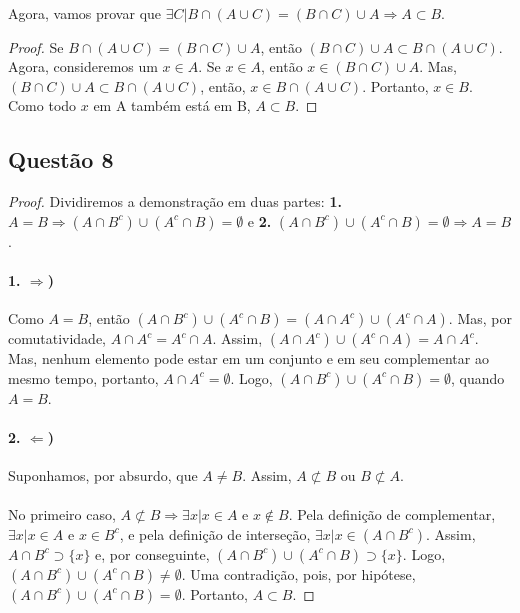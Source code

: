\documentclass[11pt,a4paper]{report}
\begin{document}
    Agora, vamos provar que $\exists C | B \cap (A \cup C) = (B \cap C) \cup A \Rightarrow A \subset B$.
    \begin{proof}
    Se $B \cap (A \cup C) = (B \cap C) \cup A$, então $(B \cap C) \cup A \subset B \cap (A \cup C)$. Agora, consideremos um $x \in A$. Se $x \in A$, então $x \in (B \cap C) \cup A$. Mas, $(B \cap C) \cup A \subset B \cap (A \cup C)$, então, $x \in B \cap (A \cup C)$. Portanto, $x \in B$. Como todo $x$ em A também está em B, $A \subset B$.
    \end{proof}

    
    \subsection{Questão 8}
    \begin{proof}
    Dividiremos a demonstração em duas partes: \textbf{1.} $A = B \Rightarrow (A \cap B^c) \cup (A^c \cap B) = \emptyset$ e \textbf{2.} $(A \cap B^c) \cup (A^c \cap B) = \emptyset \Rightarrow A = B$.

    \paragraph{1. $\Rightarrow$)}
    Como $A = B$, então $(A \cap B^c) \cup (A^c \cap B) = (A \cap A^c) \cup (A^c \cap A)$. Mas, por comutatividade, $A \cap A^c = A^c \cap A$. Assim, $(A \cap A^c) \cup (A^c \cap A) = A \cap A^c$. Mas, nenhum elemento pode estar em um conjunto e em seu complementar ao mesmo tempo, portanto, $A \cap A^c = \emptyset$. Logo, $(A \cap B^c) \cup (A^c \cap B) = \emptyset$, quando $A = B$.

    \paragraph{2. $\Leftarrow$)}
    Suponhamos, por absurdo, que $A \not= B$. Assim, $A \not\subset B$ ou $B \not\subset A$.

    \paragraph{}
    No primeiro caso, $A \not\subset B \Rightarrow \exists x | x \in A$ e $x \not\in B$. Pela definição de complementar, $\exists x | x \in A$ e $x \in B^c$, e pela definição de interseção, $\exists x | x \in (A \cap B^c)$. Assim, $A \cap B^c \supset \{x\}$ e, por conseguinte, $(A \cap B^c) \cup (A^c \cap B) \supset \{x\}$. Logo, $(A \cap B^c) \cup (A^c \cap B) \not= \emptyset$. Uma contradição, pois, por hipótese, $(A \cap B^c) \cup (A^c \cap B) = \emptyset$. Portanto, $A \subset B$.


\end{proof}
\end{document}
